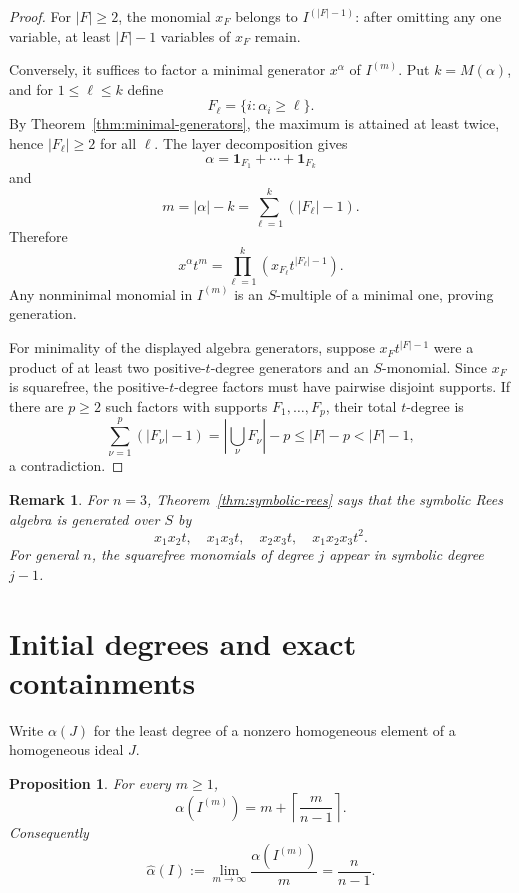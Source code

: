 \documentclass[11pt]{article}
\newtheorem{proposition}[theorem]{Proposition}
\newtheorem{remark}[theorem]{Remark}
\newcommand{\walpha}{\widehat{\alpha}}
\begin{document}
\begin{proof}
For \(|F|\ge2\), the monomial \(x_F\) belongs to
\(I^{(|F|-1)}\): after omitting any one variable, at least
\(|F|-1\) variables of \(x_F\) remain.

Conversely, it suffices to factor a minimal generator \(x^\alpha\) of
\(I^{(m)}\).  Put \(k=M(\alpha)\), and for \(1\le \ell\le k\) define
\[
 F_\ell=\{i:\alpha_i\ge\ell\}.
\]
By Theorem~\ref{thm:minimal-generators}, the maximum is attained at
least twice, hence \(|F_\ell|\ge2\) for all \(\ell\).  The layer
decomposition gives
\[
 \alpha=\mathbf1_{F_1}+\cdots+\mathbf1_{F_k}
\]
and
\[
 m=|\alpha|-k
   =\sum_{\ell=1}^k(|F_\ell|-1).
\]
Therefore
\[
 x^\alpha t^m
 =
 \prod_{\ell=1}^k
 \left(x_{F_\ell}t^{|F_\ell|-1}\right).
\]
Any nonminimal monomial in \(I^{(m)}\) is an \(S\)-multiple of a
minimal one, proving generation.

For minimality of the displayed algebra generators, suppose
\(x_Ft^{|F|-1}\) were a product of at least two positive-\(t\)-degree
generators and an \(S\)-monomial.  Since \(x_F\) is squarefree, the
positive-\(t\)-degree factors must have pairwise disjoint supports.
If there are \(p\ge2\) such factors with supports \(F_1,\ldots,F_p\),
their total \(t\)-degree is
\[
 \sum_{\nu=1}^p(|F_\nu|-1)
 =
 \left|\bigcup_\nu F_\nu\right|-p
 \le |F|-p
 <|F|-1,
\]
a contradiction.
\end{proof}

\begin{remark}
For \(n=3\), Theorem~\ref{thm:symbolic-rees} says that the symbolic
Rees algebra is generated over \(S\) by
\[
 x_1x_2t,\quad x_1x_3t,\quad x_2x_3t,\quad x_1x_2x_3t^2.
\]
For general \(n\), the squarefree monomials of degree \(j\) appear in
symbolic degree \(j-1\).
\end{remark}

\section{Initial degrees and exact containments}

Write \(\alpha(J)\) for the least degree of a nonzero homogeneous
element of a homogeneous ideal \(J\).

\begin{proposition}\label{prop:initial}
For every \(m\ge1\),
\begin{equation}\label{eq:initial}
 \alpha(I^{(m)})
 =
 m+\left\lceil\frac{m}{n-1}\right\rceil.
\end{equation}
Consequently
\[
 \walpha(I)
 :=\lim_{m\to\infty}\frac{\alpha(I^{(m)})}{m}
 =
 \frac{n}{n-1}.
\]
\end{proposition}
\end{document}
